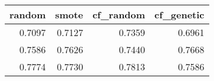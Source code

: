 \begin{tabular}{rrrr}
\toprule

 random &  smote &  cf\_random &  cf\_genetic \\
\midrule

 0.7097 & 0.7127 &     0.7359 &      0.6961 \\
 0.7586 & 0.7626 &     0.7440 &      0.7668 \\
 0.7774 & 0.7730 &     0.7813 &      0.7586 \\

\bottomrule
\end{tabular}
